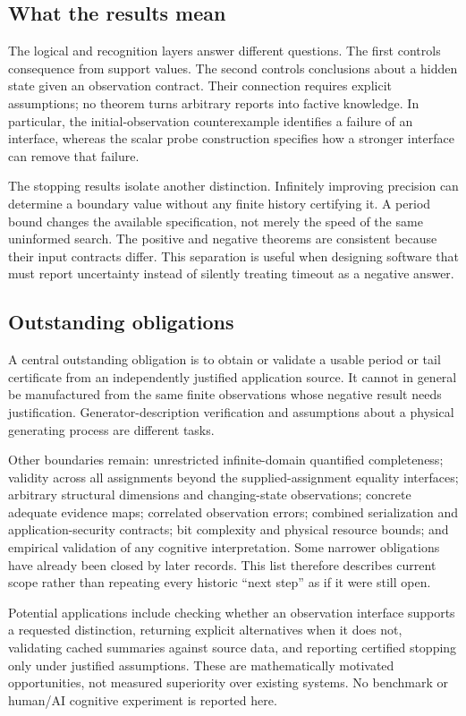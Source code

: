\documentclass[11pt,a4paper]{article}
\begin{document}
\subsection{What the results mean}
The logical and recognition layers answer different questions. The first
controls consequence from support values. The second controls conclusions
about a hidden state given an observation contract. Their connection requires
explicit assumptions; no theorem turns arbitrary reports into factive knowledge.
In particular, the initial-observation counterexample identifies a failure of
an interface, whereas the scalar probe construction specifies how a stronger
interface can remove that failure.

The stopping results isolate another distinction. Infinitely improving precision
can determine a boundary value without any finite history certifying it. A
period bound changes the available specification, not merely the speed of
the same uninformed search. The positive and negative theorems are consistent
because their input contracts differ. This separation is useful when designing
software that must report uncertainty instead of silently treating timeout as
a negative answer.

\subsection{Outstanding obligations}
A central outstanding obligation is to obtain or validate a
usable period or tail certificate from an independently justified application
source. It cannot in general be manufactured from the same finite observations
whose negative result needs justification. Generator-description verification
and assumptions about a physical generating process are different tasks.

Other boundaries remain: unrestricted infinite-domain quantified completeness;
validity across all assignments beyond the supplied-assignment equality
interfaces; arbitrary structural dimensions and changing-state observations;
concrete adequate evidence maps; correlated observation errors; combined
serialization and application-security contracts; bit complexity and physical
resource bounds; and empirical validation of any cognitive interpretation.
Some narrower obligations have already been closed by later records. This
list therefore describes current scope rather than repeating every historic
``next step'' as if it were still open.

Potential applications include checking whether an observation interface
supports a requested distinction, returning explicit alternatives when it
does not, validating cached summaries against source data, and reporting
certified stopping only under justified assumptions. These are mathematically
motivated opportunities, not measured superiority over existing systems.
No benchmark or human/AI cognitive experiment is reported here.
\end{document}
